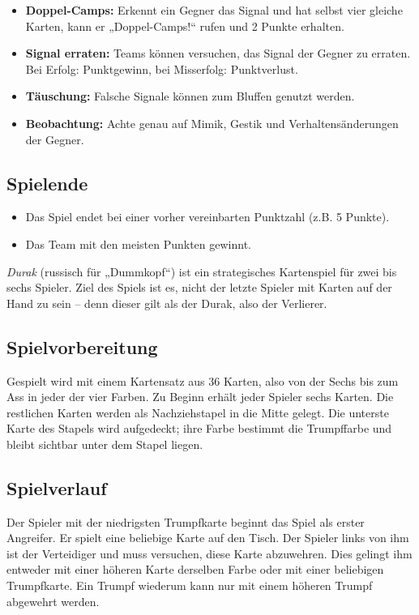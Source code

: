 \begin{itemize}
    \item \textbf{Doppel-Camps:} Erkennt ein Gegner das Signal und hat selbst vier gleiche Karten, kann er „Doppel-Camps!“ rufen und 2 Punkte erhalten.
    \item \textbf{Signal erraten:} Teams können versuchen, das Signal der Gegner zu erraten. Bei Erfolg: Punktgewinn, bei Misserfolg: Punktverlust.
    \item \textbf{Täuschung:} Falsche Signale können zum Bluffen genutzt werden.
    \item \textbf{Beobachtung:} Achte genau auf Mimik, Gestik und Verhaltensänderungen der Gegner.
\end{itemize}

\subsection*{Spielende}

\begin{itemize}
    \item Das Spiel endet bei einer vorher vereinbarten Punktzahl (z.B. 5 Punkte).
    \item Das Team mit den meisten Punkten gewinnt.
\end{itemize}


\textit{Durak} (russisch für „Dummkopf“) ist ein strategisches Kartenspiel für zwei bis sechs Spieler. Ziel des Spiels ist es, nicht der letzte Spieler mit Karten auf der Hand zu sein – denn dieser gilt als der Durak, also der Verlierer.

\subsection*{Spielvorbereitung}

Gespielt wird mit einem Kartensatz aus 36 Karten, also von der Sechs bis zum Ass in jeder der vier Farben. Zu Beginn erhält jeder Spieler sechs Karten. Die restlichen Karten werden als Nachziehstapel in die Mitte gelegt. Die unterste Karte des Stapels wird aufgedeckt; ihre Farbe bestimmt die Trumpffarbe und bleibt sichtbar unter dem Stapel liegen.

\subsection*{Spielverlauf}

Der Spieler mit der niedrigsten Trumpfkarte beginnt das Spiel als erster Angreifer. Er spielt eine beliebige Karte auf den Tisch. Der Spieler links von ihm ist der Verteidiger und muss versuchen, diese Karte abzuwehren. Dies gelingt ihm entweder mit einer höheren Karte derselben Farbe oder mit einer beliebigen Trumpfkarte. Ein Trumpf wiederum kann nur mit einem höheren Trumpf abgewehrt werden.


